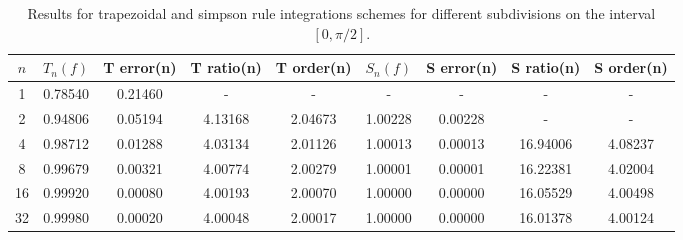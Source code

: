 \begin{table}[H]
\centering
\caption{Results for trapezoidal and simpson rule integrations schemes for different subdivisions on the interval $[0,\pi/2]$.}
\begin{tabular}{ccccccccc}
\toprule
$n$ & $T_n(f)$ & T error(n) & T ratio(n) & T order(n) & $S_n(f)$ & S error(n) & S ratio(n) & S order(n) \\
\midrule
  1 &  0.78540 &    0.21460 &          - &          - &        - &          - &          - &          - \\
  2 &  0.94806 &    0.05194 &    4.13168 &    2.04673 &  1.00228 &    0.00228 &          - &          - \\
  4 &  0.98712 &    0.01288 &    4.03134 &    2.01126 &  1.00013 &    0.00013 &   16.94006 &    4.08237 \\
  8 &  0.99679 &    0.00321 &    4.00774 &    2.00279 &  1.00001 &    0.00001 &   16.22381 &    4.02004 \\
 16 &  0.99920 &    0.00080 &    4.00193 &    2.00070 &  1.00000 &    0.00000 &   16.05529 &    4.00498 \\
 32 &  0.99980 &    0.00020 &    4.00048 &    2.00017 &  1.00000 &    0.00000 &   16.01378 &    4.00124 \\
\bottomrule
\end{tabular}
\end{table}
